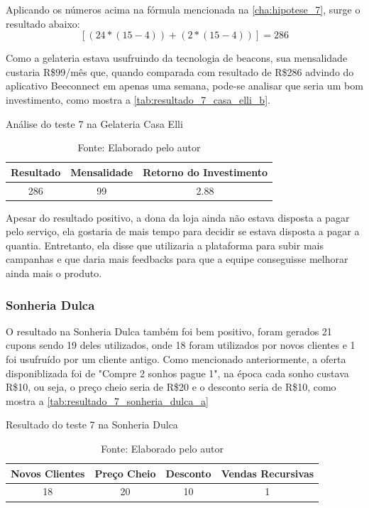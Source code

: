 Aplicando os números acima na fórmula mencionada na \autoref{cha:hipotese_7}, surge o resultado abaixo:
\[[(24 * (15 - 4)) + (2 * (15 - 4))] = 286\]

Como a gelateria estava usufruindo da tecnologia de beacons, sua mensalidade custaria R\$99/mês que, quando comparada com resultado de R\$286 advindo do aplicativo Beeconnect em apenas uma semana, pode-se analisar que seria um bom investimento, como mostra a \autoref{tab:resultado_7_casa_elli_b}. 

\begin{table}[H]
\centering
\caption{Análise do teste 7 na Gelateria Casa Elli}
\label{tab:resultado_7_casa_elli_b}
\begin{tabular}{|c|c|c|}
\hline
Resultado & Mensalidade & Retorno do Investimento \\ \hline
286             & 99          &   2.88 \\ \hline
\end{tabular}
\caption* {Fonte: Elaborado pelo autor}    
\end{table}

Apesar do resultado positivo, a dona da loja ainda não estava disposta a pagar pelo serviço, ela gostaria de mais tempo para decidir se estava disposta a pagar a quantia. Entretanto, ela disse que utilizaria a plataforma para subir mais campanhas e que daria mais feedbacks para que a equipe conseguisse melhorar ainda mais o produto.

\subsubsection{Sonheria Dulca}
\label{cha:resultado_sonheria_dulca}
O resultado na Sonheria Dulca também foi bem positivo, foram gerados 21 cupons sendo 19 deles utilizados, onde 18 foram utilizados por novos clientes e 1 foi usufruído por um cliente antigo. Como mencionado anteriormente, a oferta disponiblizada foi de "Compre 2 sonhos pague 1", na época cada sonho custava R\$10, ou seja, o preço cheio seria de R\$20 e o desconto seria de R\$10, como mostra a \autoref{tab:resultado_7_sonheria_dulca_a}

\begin{table}[H]
\centering
\caption{Resultado do teste 7 na Sonheria Dulca}
\label{tab:resultado_7_sonheria_dulca_a}
\begin{tabular}{|c|c|c|c|}
\hline
Novos Clientes & Preço Cheio & Desconto & Vendas Recursivas \\ \hline
18             & 20          & 10        & 1   \\ \hline
\end{tabular}
\caption* {Fonte: Elaborado pelo autor}    
\end{table}

